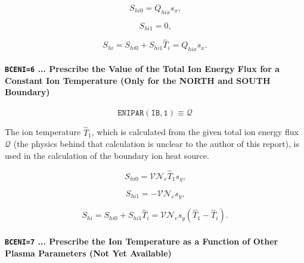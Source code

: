 \documentclass[11pt]{article}
\begin{document}
\begin{equation}
S_{hi0}=Q_{hix}s_{x}\text{,}   \label{c276}
\end{equation}

\begin{equation}
S_{hi1}=0\text{,}   \label{c277}
\end{equation}

\begin{equation}
S_{hi}=S_{hi0}+S_{hi1}\widehat{T}_{i}=Q_{hix}s_{x}\text{.}   \label{c278}
\end{equation}

\bigskip

\paragraph{\texttt{BCENI=6} ... Prescribe the Value of the Total Ion Energy
Flux for a Constant Ion Temperature (Only for the NORTH and SOUTH Boundary)}

\bigskip

\begin{equation*}
\mathtt{ENIPAR(IB,1)}\equiv\mathcal{Q}
\end{equation*}

\bigskip

The ion temperature $\widehat{T}_{1}$, which is calculated from the given
total ion energy flux $\mathcal{Q}$ (the physics behind that calculation is
unclear to the author of this report), is used in the calculation of the
boundary ion heat source.

\bigskip

\begin{equation}
S_{hi0}=\mathcal{VN}_{e}\widehat{T}_{1}s_{y}\text{,}   \label{c279}
\end{equation}

\begin{equation}
S_{hi1}=-\mathcal{VN}_{e}s_{y}\text{,}   \label{c280}
\end{equation}

\begin{equation}
S_{hi}=S_{hi0}+S_{hi1}\widehat{T}_{i}=\mathcal{VN}_{e}s_{y}\left( \widehat
{T}_{1}-\widehat{T}_{i}\right) \text{.}   \label{c281}
\end{equation}

\bigskip

\paragraph{\texttt{BCENI=7} ... Prescribe the Ion Temperature as a Function
of Other Plasma Parameters (Not Yet Available)}
\end{document}
